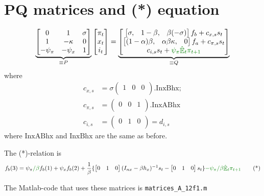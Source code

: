 \documentclass[11pt]{article}
\renewcommand{\[}{\begin{equation}}
\renewcommand{\]}{\end{equation}}
\DeclareMathOperator{\E}{\mathbb{E}}
\begin{document}
\section{PQ matrices and (*) equation}
\begin{equation}
\underbrace{\begin{bmatrix} 0& 1&  \sigma \\ 1& -\kappa & 0 \\ -\psi_{\pi} & -\psi_{x} & 1 \end{bmatrix}}_{\equiv P}\begin{bmatrix} \pi_t \\ x_t \\i_t \end{bmatrix} = \underbrace{\begin{bmatrix} \begin{bmatrix}\sigma, &1-\beta, &\beta  (-\sigma )\end{bmatrix}f_b +c_{x,s} s_t \\ \begin{bmatrix}(1-\alpha ) \beta ,&\alpha  \beta  \kappa ,&0\end{bmatrix}f_a +c_{\pi,s} s_t \\ c_{i,s} s_t + \textcolor{mygreen}{\psi_{\pi}\hat{\E}_t\pi_{t+1}}\end{bmatrix}}_{\equiv Q}
\end{equation}
where 
\begin{align}
c_{x,s} & = \sigma  \left(
\begin{array}{ccc}
 1 & 0 & 0 \\
\end{array}
\right).\text{InxBhx};\\
c_{\pi,s} & = \left(
\begin{array}{ccc}
 0 & 0 & 1 \\
\end{array}
\right).\text{InxABhx}\\
c_{i,s} & = \left(
\begin{array}{ccc}
 0 & 1 & 0 \\
\end{array}
\right) = d_{i,s}
\end{align}
where $\text{InxABhx}$ and $\text{InxBhx}$ are the same as before.

The (*)-relation is
\begin{equation}
f_b(3) = \psi_{\pi}\textcolor{mygreen}{/\beta}f_b(1) + \psi_{x}f_b(2) + \frac{1}{\beta}\{ \begin{bmatrix} 0 &1 & 0  \end{bmatrix}(I_{nx}-\beta h_x)^{-1} s_t - \begin{bmatrix} 0 &1 & 0  \end{bmatrix}s_t  \} \textcolor{mygreen}{-\psi_{\pi}/\beta\hat{\E}_t\pi_{t+1}}\tag{*}
\end{equation}


The Matlab-code that uses these matrices is \texttt{matrices\_A\_12f1.m}
\end{document}
